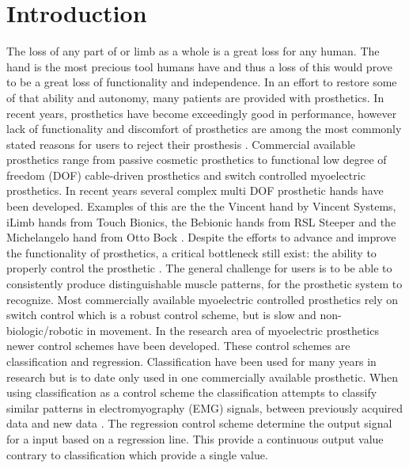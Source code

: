 
\section{Introduction}			%


%


The loss of any part of or limb as a whole is a great loss for any human. The hand is the most precious tool humans have and thus a loss of this would prove to be a great loss of functionality and independence. In an effort to restore some of that ability and autonomy, many patients are provided with prosthetics. 
In recent years, prosthetics have become exceedingly good in performance, however lack of functionality and discomfort of prosthetics are among the most commonly stated reasons for users to reject their prosthesis \cite{Reiber2010}. Commercial available prosthetics range from passive cosmetic prosthetics to functional low degree of freedom (DOF) cable-driven prosthetics and switch controlled myoelectric prosthetics. 
In recent years several complex multi DOF prosthetic hands have been developed. Examples of this are the the Vincent hand by Vincent Systems, iLimb hands from Touch Bionics, the Bebionic hands from RSL Steeper and the Michelangelo hand from Otto Bock \cite{Belter2013}. Despite the efforts to advance and improve the functionality of prosthetics, a critical bottleneck still exist: the ability to properly control the prosthetic \cite{Hwang2017}. The general challenge for users is to be able to consistently produce distinguishable muscle patterns, for the prosthetic system to recognize. \cite{Powell2014} 
Most commercially available myoelectric controlled prosthetics rely on switch control which is a robust control scheme, but is slow and non-biologic/robotic in movement. In the research area of myoelectric prosthetics newer control schemes have been developed.%
These control schemes are classification and regression. Classification have been used for many years in research but is to date only used in one commercially available prosthetic. When using classification as a control scheme the classification attempts to classify similar patterns in electromyography (EMG) signals, between previously acquired data and new data \cite{Mendez2017}. The regression control scheme determine the output signal for a input based on a regression line. This provide a continuous output value contrary to classification which provide a single value. \cite{Hahne2014} 
